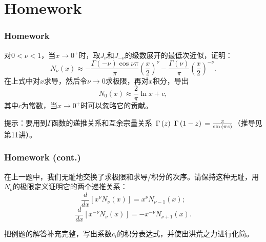 \documentclass[CJK]{beamer}
\begin{document}
\section{Homework}

\begin{frame}
\frametitle{Homework}

\bitem
\item{对$0<\nu<1$，当$x\rightarrow 0^+$时，取$J_\nu$和$J_{-\nu}$的级数展开的最低次近似，证明：
  $$N_\nu(x) \approx -\frac{\Gamma(-\nu)\cos{\nu\pi}}{\pi}\left(\frac{x}{2}\right)^\nu - \frac{\Gamma(\nu)}{\pi}\left(\frac{x}{2}\right)^{-\nu}. $$
  在上式中对$x$求导，然后令$\nu\rightarrow 0$求极限，再对$x$积分，导出
  $$ N_0(x)\approx \frac{2}{\pi}\ln x + c,$$
  其中$c$为常数，当$x\rightarrow 0^+$时可以忽略它的贡献。

  \skiplines
      {\small \darkgreen 提示：要用到$\Gamma$函数的递推关系和互余宗量关系
        $\,\Gamma\left( z \right)\,\,\Gamma\left( 1-z \right)\,=\frac{\pi}{\sin{(\pi z)}}$（推导见第11讲）。}}
  \eitem

\end{frame}


\begin{frame}
\frametitle{Homework (cont.)}
\bitem
\item{在上一题中，我们无耻地交换了求极限和求导/积分的次序。请保持这种无耻，用$N_\nu$的极限定义证明它的两个递推关系：
  $$ \frac{d}{dx}\left[x^\nu N_\nu(x)\right] = x^\nu N_{\nu -1}(x);$$
  $$ \frac{d}{dx}\left[x^{-\nu} N_\nu(x)\right] = -x^{-\nu} N_{\nu +1}(x).  $$
}
\item{把例题的解答补充完整，写出系数$c_i$的积分表达式，并使出洪荒之力进行化简。}  \eitem
\end{frame}

\ech
\end{document}
